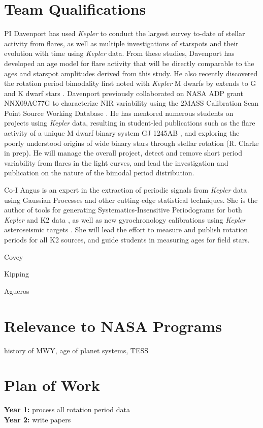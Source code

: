 \documentclass[12pt]{article}
\newcommand{\Kepler}{\textsl{Kepler}\xspace}
\begin{document}
\section{Team Qualifications}
PI Davenport has used \Kepler to conduct the largest survey to-date of stellar activity from flares, as well as multiple investigations of starspots and their evolution with time using \Kepler data. From these studies, Davenport has developed an age model for flare activity that will be directly comparable to the ages and starspot amplitudes derived from this study. He also recently discovered the rotation period bimodality first noted with \Kepler M dwarfs by \citet{mcquillan2013} extends to G and K dwarf stars \citep{davenport2017}.
Davenport previously collaborated on NASA ADP grant NNX09AC77G to characterize NIR variability using the 2MASS Calibration Scan Point Source Working Database \citep{davenport2012,davenport2015a}.
He has mentored numerous students on projects using \Kepler data, resulting in student-led publications such as the flare activity of a unique M dwarf binary system GJ 1245AB \citep{lurie2015}, and exploring the poorly understood origins of wide binary stars through stellar rotation (R. Clarke in prep). He will manage the overall project, detect and remove short period variability from flares in the light curves, and lead the investigation and publication on the nature of the bimodal period distribution.

Co-I Angus is an expert in the extraction of periodic signals from \Kepler data using Gaussian Processes \citep{angus2016c} and other cutting-edge statistical techniques. She is the author of tools for generating Systematics-Insensitive Periodograms for both \Kepler and K2 data \citep{angus2016}, as well as new gyrochronology calibrations using \Kepler asteroseismic targets \citep{angus2015}. She will lead the effort to measure and publish rotation periods for all K2 sources, and guide students in measuring ages for field stars.

Covey

Kipping

Agueros

\section{Relevance to NASA Programs}
history of MWY, age of planet systems, TESS



\section{Plan of Work}
{\bf Year 1:} process all rotation period data
\\
{\bf Year 2:} write papers



\clearpage


\end{document}
